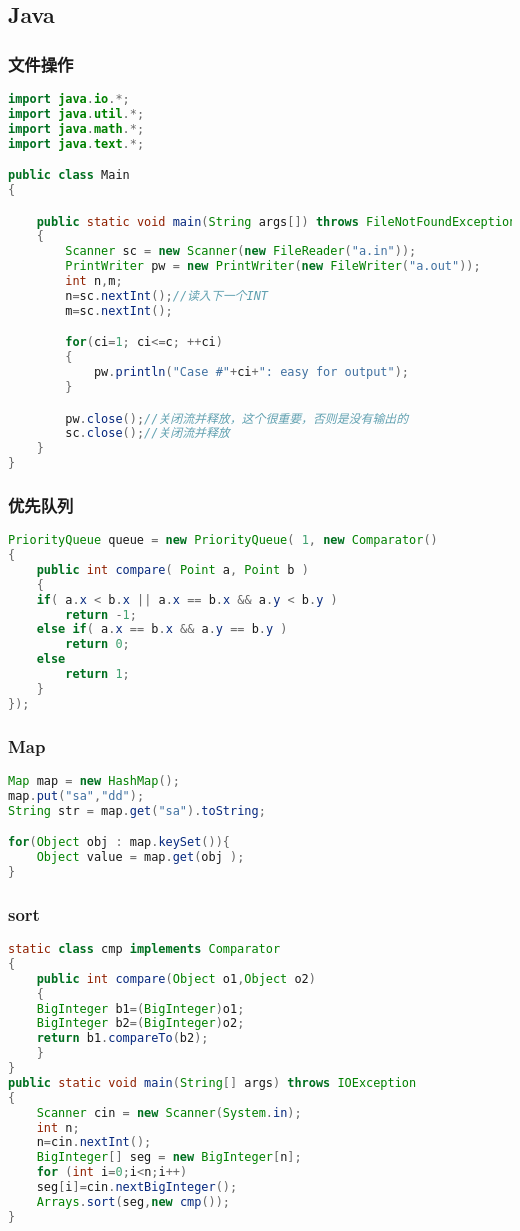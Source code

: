 \subsection{Java}
	\subsubsection{文件操作}
	\begin{lstlisting}[language=java]
import java.io.*;
import java.util.*;
import java.math.*;
import java.text.*;

public class Main
{

	public static void main(String args[]) throws FileNotFoundException, IOException
	{
		Scanner sc = new Scanner(new FileReader("a.in"));
		PrintWriter pw = new PrintWriter(new FileWriter("a.out"));
		int n,m;
		n=sc.nextInt();//读入下一个INT
		m=sc.nextInt();

		for(ci=1; ci<=c; ++ci)
		{
			pw.println("Case #"+ci+": easy for output");
		}

		pw.close();//关闭流并释放，这个很重要，否则是没有输出的
		sc.close();//关闭流并释放
	}
}
	\end{lstlisting}
	
	\subsubsection{优先队列}
	\begin{lstlisting}[language=java]
PriorityQueue queue = new PriorityQueue( 1, new Comparator()
{
	public int compare( Point a, Point b )
	{
	if( a.x < b.x || a.x == b.x && a.y < b.y )
		return -1;
	else if( a.x == b.x && a.y == b.y )
		return 0;
	else
		return 1;
	}
});
	\end{lstlisting}
	
	\subsubsection{Map}
	\begin{lstlisting}[language=java]
Map map = new HashMap();
map.put("sa","dd");
String str = map.get("sa").toString;

for(Object obj : map.keySet()){
	Object value = map.get(obj );
}
	\end{lstlisting}
	
	\subsubsection{sort}
	\begin{lstlisting}[language=java]
static class cmp implements Comparator
{
	public int compare(Object o1,Object o2)
	{
	BigInteger b1=(BigInteger)o1;
	BigInteger b2=(BigInteger)o2;
	return b1.compareTo(b2);
	}
}
public static void main(String[] args) throws IOException
{
	Scanner cin = new Scanner(System.in);
	int n;
	n=cin.nextInt();
	BigInteger[] seg = new BigInteger[n];
	for (int i=0;i<n;i++)
	seg[i]=cin.nextBigInteger();
	Arrays.sort(seg,new cmp());
}
	\end{lstlisting}
